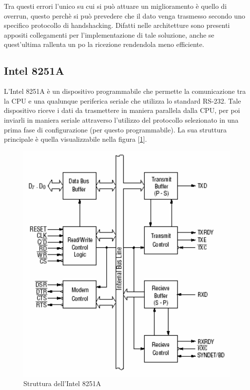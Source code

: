 Tra questi errori l'unico su cui si può attuare un miglioramento è quello di overrun, questo perchè si può prevedere che il dato venga trasmesso secondo uno specifico protocollo di handshacking. Difatti nelle architetture sono presenti appositi collegamenti per l'implementazione di tale soluzione, anche se quest'ultima rallenta un po la ricezione rendendola meno efficiente.

\subsection{Intel 8251A}\label{par:intel-8251A}
L'Intel 8251A è un dispositivo programmabile che permette la comunicazione tra la CPU e una qualunque periferica seriale che utilizza lo standard RS-232. Tale dispositivo riceve i dati da trasmettere in maniera parallela dalla CPU, per poi inviarli in maniera seriale attraverso l'utilizzo del protocollo selezionato in una prima fase di configurazione (per questo programmabile). 
La sua struttura principale è quella visualizzabile nella figura [\ref{img:Intel-8251A}].

\begin{figure}[ht]
    \centering
    \includegraphics[width=.5\textwidth]{img/Intel8251A.png}
    \caption{Struttura dell'Intel 8251A}\label{img:Intel-8251A}
\end{figure}

